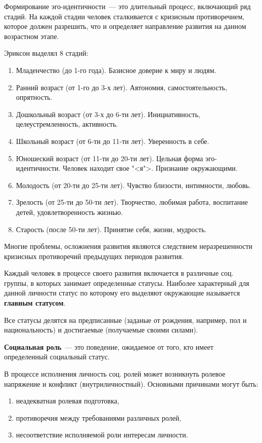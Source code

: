 Формирование эго-идентичности~--- это длительный процесс, включающий ряд стадий. На каждой стадии человек сталкивается с кризисным противоречием, которое должен разрешить, что и определяет направление развития на данном возрастном этапе.

Эриксон выделял 8 стадий:
\begin{enumerate}
	\item Младенчество (до 1-го года). Базисное доверие к миру и людям.
	\item Ранний возраст (от 1-го до 3-х лет). Автономия, самостоятельность, опрятность.
	\item Дошкольный возраст (от 3-х до 6-ти лет). Инициативность, целеустремленность, активность.
	\item Школьный возраст (от 6-ти до 11-ти лет). Уверенность в себе.
	\item Юношеский возраст (от 11-ти до 20-ти лет). Цельная форма эго-идентичности. Человек находит свое "<я">. Признание окружающими.
	\item Молодость (от 20-ти до 25-ти лет). Чувство близости, интимности, любовь.
	\item Зрелость (от 25-ти до 50-ти лет). Творчество, любимая работа, воспитание детей, удовлетворенность жизнью.
	\item Старость (после 50-ти лет). Принятие себя, жизни, мудрость.
\end{enumerate}

Многие проблемы, осложнения развития являются следствием неразрешенности кризисных противоречий предыдущих периодов развития.

Каждый человек в процессе своего развития включается в различные соц. группы, в которых занимает определенные статусы. Наиболее характерный для данной личности статус по которому его выделяют окружающие называется \textbf{главным статусом}.

Все статусы делятся на предписанные (заданые от рождения, например, пол и национальность) и достигаемые (получаемые своими силами).

\textbf{Социальная роль}~--- это поведение, ожидаемое от того, кто имеет определенный социальный статус.

В процессе исполнения личность соц. ролей может возникнуть ролевое напряжение и конфликт (внутриличностный). Основными причинами могут быть:
\begin{enumerate}
	\item неадекватная ролевая подготовка,
	\item противоречия между требованиями различных ролей,
	\item несоответствие исполняемой роли интересам личности.
\end{enumerate}


